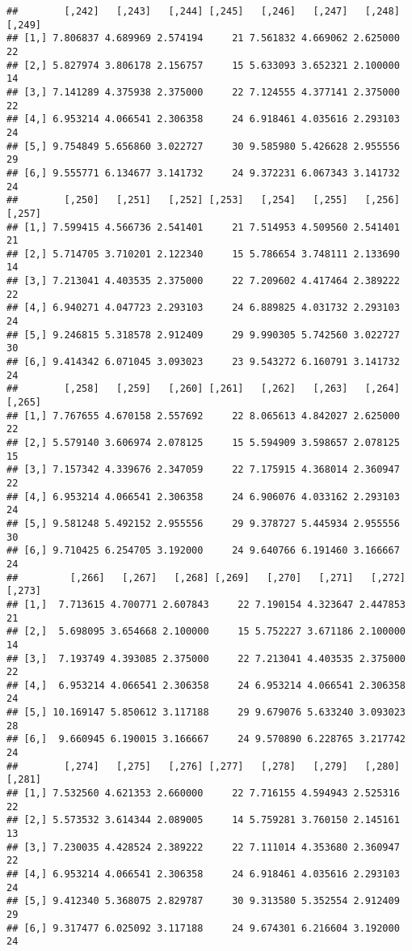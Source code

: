 \documentclass[]{article}
\begin{document}
\begin{verbatim}
##        [,242]   [,243]   [,244] [,245]   [,246]   [,247]   [,248] [,249]
## [1,] 7.806837 4.689969 2.574194     21 7.561832 4.669062 2.625000     22
## [2,] 5.827974 3.806178 2.156757     15 5.633093 3.652321 2.100000     14
## [3,] 7.141289 4.375938 2.375000     22 7.124555 4.377141 2.375000     22
## [4,] 6.953214 4.066541 2.306358     24 6.918461 4.035616 2.293103     24
## [5,] 9.754849 5.656860 3.022727     30 9.585980 5.426628 2.955556     29
## [6,] 9.555771 6.134677 3.141732     24 9.372231 6.067343 3.141732     24
##        [,250]   [,251]   [,252] [,253]   [,254]   [,255]   [,256] [,257]
## [1,] 7.599415 4.566736 2.541401     21 7.514953 4.509560 2.541401     21
## [2,] 5.714705 3.710201 2.122340     15 5.786654 3.748111 2.133690     14
## [3,] 7.213041 4.403535 2.375000     22 7.209602 4.417464 2.389222     22
## [4,] 6.940271 4.047723 2.293103     24 6.889825 4.031732 2.293103     24
## [5,] 9.246815 5.318578 2.912409     29 9.990305 5.742560 3.022727     30
## [6,] 9.414342 6.071045 3.093023     23 9.543272 6.160791 3.141732     24
##        [,258]   [,259]   [,260] [,261]   [,262]   [,263]   [,264] [,265]
## [1,] 7.767655 4.670158 2.557692     22 8.065613 4.842027 2.625000     22
## [2,] 5.579140 3.606974 2.078125     15 5.594909 3.598657 2.078125     15
## [3,] 7.157342 4.339676 2.347059     22 7.175915 4.368014 2.360947     22
## [4,] 6.953214 4.066541 2.306358     24 6.906076 4.033162 2.293103     24
## [5,] 9.581248 5.492152 2.955556     29 9.378727 5.445934 2.955556     30
## [6,] 9.710425 6.254705 3.192000     24 9.640766 6.191460 3.166667     24
##         [,266]   [,267]   [,268] [,269]   [,270]   [,271]   [,272] [,273]
## [1,]  7.713615 4.700771 2.607843     22 7.190154 4.323647 2.447853     21
## [2,]  5.698095 3.654668 2.100000     15 5.752227 3.671186 2.100000     14
## [3,]  7.193749 4.393085 2.375000     22 7.213041 4.403535 2.375000     22
## [4,]  6.953214 4.066541 2.306358     24 6.953214 4.066541 2.306358     24
## [5,] 10.169147 5.850612 3.117188     29 9.679076 5.633240 3.093023     28
## [6,]  9.660945 6.190015 3.166667     24 9.570890 6.228765 3.217742     24
##        [,274]   [,275]   [,276] [,277]   [,278]   [,279]   [,280] [,281]
## [1,] 7.532560 4.621353 2.660000     22 7.716155 4.594943 2.525316     22
## [2,] 5.573532 3.614344 2.089005     14 5.759281 3.760150 2.145161     13
## [3,] 7.230035 4.428524 2.389222     22 7.111014 4.353680 2.360947     22
## [4,] 6.953214 4.066541 2.306358     24 6.918461 4.035616 2.293103     24
## [5,] 9.412340 5.368075 2.829787     30 9.313580 5.352554 2.912409     29
## [6,] 9.317477 6.025092 3.117188     24 9.674301 6.216604 3.192000     24

\end{verbatim}
\end{document}
